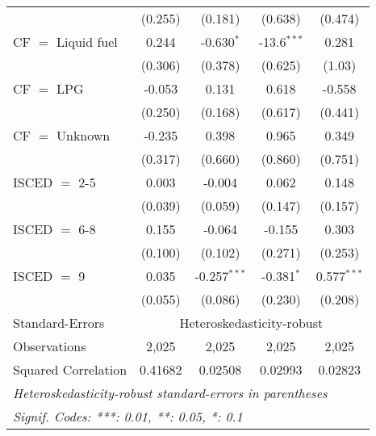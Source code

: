 \begin{table}[htbp!]
\begin{adjustbox}{width = 1\textwidth, max height = 0.95\textheight, center}
\begin{threeparttable}[b]
\begin{tabular}{lcccc}
                                 & (0.255)            & (0.181)            & (0.638)        & (0.474)\\   
            CF $=$ Liquid fuel   & 0.244              & -0.630$^{*}$       & -13.6$^{***}$  & 0.281\\   
                                 & (0.306)            & (0.378)            & (0.625)        & (1.03)\\   
            CF $=$ LPG           & -0.053             & 0.131              & 0.618          & -0.558\\   
                                 & (0.250)            & (0.168)            & (0.617)        & (0.441)\\   
            CF $=$ Unknown       & -0.235             & 0.398              & 0.965          & 0.349\\   
                                 & (0.317)            & (0.660)            & (0.860)        & (0.751)\\   
            ISCED $=$ 2-5        & 0.003              & -0.004             & 0.062          & 0.148\\   
                                 & (0.039)            & (0.059)            & (0.147)        & (0.157)\\   
            ISCED $=$ 6-8        & 0.155              & -0.064             & -0.155         & 0.303\\   
                                 & (0.100)            & (0.102)            & (0.271)        & (0.253)\\   
            ISCED $=$ 9          & 0.035              & -0.257$^{***}$     & -0.381$^{*}$   & 0.577$^{***}$\\   
                                 & (0.055)            & (0.086)            & (0.230)        & (0.208)\\   
            \midrule 
            Standard-Errors & \multicolumn{4}{c}{Heteroskedasticity-robust} \\ 
            Observations         & 2,025              & 2,025              & 2,025          & 2,025\\  
            Squared Correlation  & 0.41682            & 0.02508            & 0.02993        & 0.02823\\  
            \midrule \midrule
            \multicolumn{5}{l}{\emph{Heteroskedasticity-robust standard-errors in parentheses}}\\
            \multicolumn{5}{l}{\emph{Signif. Codes: ***: 0.01, **: 0.05, *: 0.1}}\\
         \end{tabular}
         

\end{threeparttable}
\end{adjustbox}
\end{table}

